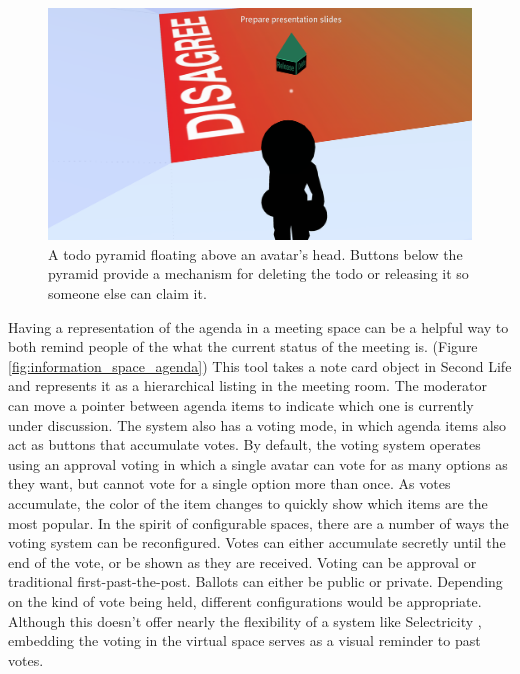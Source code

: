 \begin{figure}[tp]
	\includegraphics{figures/todo.png}
	\caption{A todo pyramid floating above an avatar's head. Buttons below the pyramid provide a mechanism for deleting the todo or releasing it so someone else can claim it.}
	\label{fig:information_space_todo}
\end{figure}


Having a representation of the agenda in a meeting space can be a helpful way to both remind people of the what the current status of the meeting is. (Figure \ref{fig:information_space_agenda}) This tool takes a note card object in Second Life and represents it as a hierarchical listing in the meeting room. The moderator can move a pointer between agenda items to indicate which one is currently under discussion. The system also has a voting mode, in which agenda items also act as buttons that accumulate votes. By default, the voting system operates using an approval voting in which a single avatar can vote for as many options as they want, but cannot vote for a single option more than once. As votes accumulate, the color of the item changes to quickly show which items are the most popular. In the spirit of configurable spaces, there are a number of ways the voting system can be reconfigured. Votes can either accumulate secretly until the end of the vote, or be shown as they are received. Voting can be approval or traditional first-past-the-post. Ballots can either be public or private. Depending on the kind of vote being held, different configurations would be appropriate. Although this doesn't offer nearly the flexibility of a system like Selectricity \citep{Hill:2006vw}, embedding the voting in the virtual space serves as a visual reminder to past votes.
 


